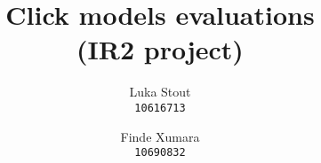 \documentclass{article} %
\title{
Click models evaluations\\
\small {(IR2 project)}
}
\author{
Luka Stout\\
\texttt{10616713} \\
\and
Finde Xumara \\
\texttt{10690832} \\
}
\begin{document}
\nocite{*}
\maketitle








{}


\newpage

\end{document}
